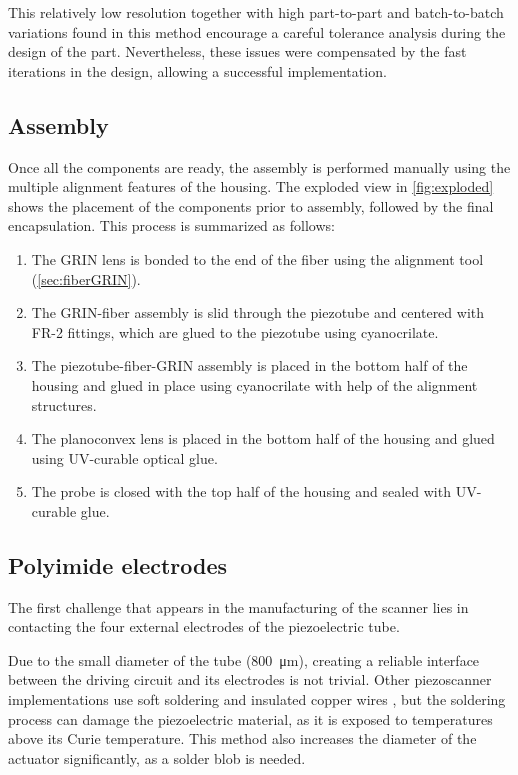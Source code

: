 \documentclass[10pt]{iopart}
\begin{document}
This relatively low resolution together with high part-to-part and batch-to-batch variations found in this method encourage a careful tolerance analysis during the design of the part. Nevertheless, these issues were compensated by the fast iterations in the design, allowing a successful implementation.


\subsection{Assembly}

Once all the components are ready, the assembly is performed manually using the multiple alignment features of the housing. The exploded view in \autoref{fig:exploded} shows the placement of the components prior to assembly, followed by the final encapsulation. This process is summarized as follows:

\begin{enumerate}
\item The GRIN lens is bonded to the end of the fiber using the alignment tool (\autoref{sec:fiberGRIN}).
\item The GRIN-fiber assembly is slid through the piezotube and centered with FR-2 fittings, which are glued to the piezotube using cyanocrilate.
\item The piezotube-fiber-GRIN assembly is placed in the bottom half of the housing and glued in place using cyanocrilate with help of the alignment structures.
\item The planoconvex lens is placed in the bottom half of the housing and glued using UV-curable optical glue.
\item The probe is closed with the top half of the housing and sealed with UV-curable glue.
\end{enumerate}


\subsection{Polyimide electrodes}

The first challenge that appears in the manufacturing of the scanner lies in contacting the four external electrodes of the piezoelectric tube. 

Due to the small diameter of the tube (\SI{800}{\micro\meter}), creating a reliable interface between the driving circuit and its electrodes is not trivial. Other piezoscanner implementations use soft soldering and insulated copper wires \cite{Lee2010, Meinert, Huo2010}, but the soldering process can damage the piezoelectric material, as it is exposed to temperatures above its Curie temperature. This method also increases the diameter of the actuator significantly, as a solder blob is needed. %
\end{document}
